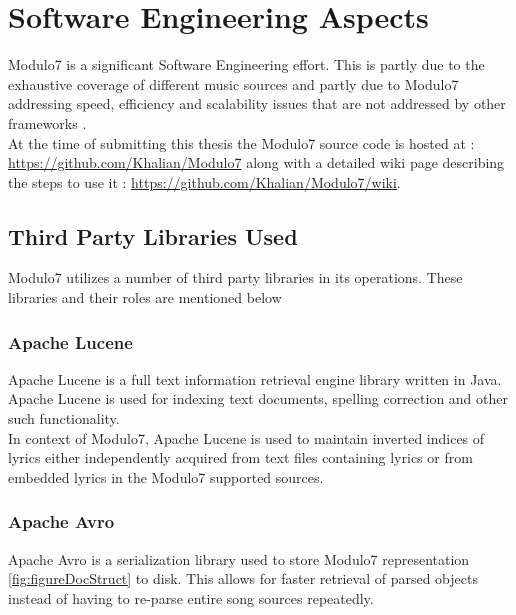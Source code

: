 \appendix
{}
\chapter{Software Engineering Aspects}

\noindent Modulo7 is a significant Software Engineering effort. This is partly due to the exhaustive coverage of different music sources and partly due to Modulo7 addressing speed, efficiency and scalability issues that are not addressed by other frameworks \cite{jMIR, humdrum, similie}. \\

\noindent At the time of submitting this thesis the Modulo7 source code is hosted at : \\ \url{https://github.com/Khalian/Modulo7} along with a detailed wiki page describing the steps to use it : \url{https://github.com/Khalian/Modulo7/wiki}. 

\section{Third Party Libraries Used}

\noindent Modulo7 utilizes a number of third party libraries in its operations. These libraries and their roles are mentioned below

\subsection{Apache Lucene} \label{lucene}

\noindent Apache Lucene is a full text information retrieval engine library written in Java. Apache Lucene is used for indexing text documents, spelling correction and other such functionality. \\

\noindent In context of Modulo7, Apache Lucene is used to maintain inverted indices of lyrics either independently acquired from text files containing lyrics or from embedded lyrics in the Modulo7 supported sources. 

\subsection{Apache Avro} \label{avro}

\noindent Apache Avro is a serialization library used to store Modulo7 representation \ref{fig:figureDocStruct} to disk. This allows for faster retrieval of parsed objects instead of having to re-parse entire song sources repeatedly.

